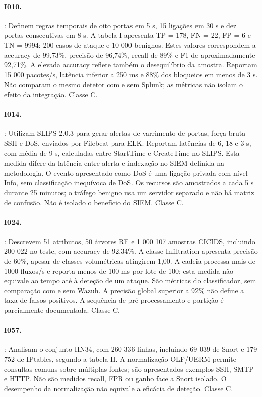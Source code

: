 \documentclass[11pt,a4paper]{article}
\begin{document}
\paragraph{I010.} \citet{chandran2026}: Definem regras temporais de oito portas em 5 s, 15 ligações em 30 s e dez portas consecutivas em 8 s. A tabela I apresenta TP = 178, FN = 22, FP = 6 e TN = 9994: 200 casos de ataque e 10 000 benignos. Estes valores correspondem a accuracy de 99,73\%, precisão de 96,74\%, recall de 89\% e F1 de aproximadamente 92,71\%. A elevada accuracy reflete também o desequilíbrio da amostra. Reportam 15 000 pacotes/s, latência inferior a 250 ms e 88\% dos bloqueios em menos de 3 s. Não comparam o mesmo detetor com e sem Splunk; as métricas não isolam o efeito da integração. Classe C.

\paragraph{I014.} \citet{pattinama2026}: Utilizam SLIPS 2.0.3 para gerar alertas de varrimento de portas, força bruta SSH e DoS, enviados por Filebeat para ELK. Reportam latências de 6, 18 e 3 s, com média de 9 s, calculadas entre StartTime e CreateTime no SLIPS. Esta medida difere da latência entre alerta e indexação no SIEM definida na metodologia. O evento apresentado como DoS é uma ligação privada com nível Info, sem classificação inequívoca de DoS. Os recursos são amostrados a cada 5 s durante 25 minutos; o tráfego benigno usa um servidor separado e não há matriz de confusão. Não é isolado o benefício do SIEM. Classe C.

\paragraph{I024.} \citet{predictive2026}: Descrevem 51 atributos, 50 árvores RF e 1 000 107 amostras CICIDS, incluindo 200 022 no teste, com accuracy de 92,34\%. A classe Infiltration apresenta precisão de 60\%, apesar de classes volumétricas atingirem 1,00. A cadeia processa mais de 1000 fluxos/s e reporta menos de 100 ms por lote de 100; esta medida não equivale ao tempo até à deteção de um ataque. São métricas do classificador, sem comparação com e sem Wazuh. A precisão global superior a 92\% não define a taxa de falsos positivos. A sequência de pré-processamento e partição é parcialmente documentada. Classe C.

\paragraph{I057.} \citet{normalisation2014}: Analisam o conjunto HN34, com 260 336 linhas, incluindo 69 039 de Snort e 179 752 de IPtables, segundo a tabela II. A normalização OLF/UERM permite consultas comuns sobre múltiplas fontes; são apresentados exemplos SSH, SMTP e HTTP. Não são medidos recall, FPR ou ganho face a Snort isolado. O desempenho da normalização não equivale a eficácia de deteção. Classe C.
\end{document}
